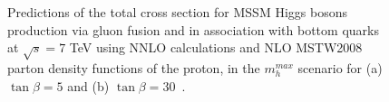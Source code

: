 \begin{figure}[tp]
     \begin{center}

    \end{center}
    \caption{Predictions of the total cross section for MSSM Higgs bosons production  via gluon fusion and in association with
	bottom quarks  at $\sqrt{s} = 7$ TeV using NNLO calculations and NLO MSTW2008 
	parton density functions of the proton, in the   $m_h^{max}$ scenario for (a) $\tan\beta  = 5$ and 
	(b) $\tan\beta  = 30$~\cite{LHCxsec1}.
	 }

   \label{fig:xsec}
\end{figure}


